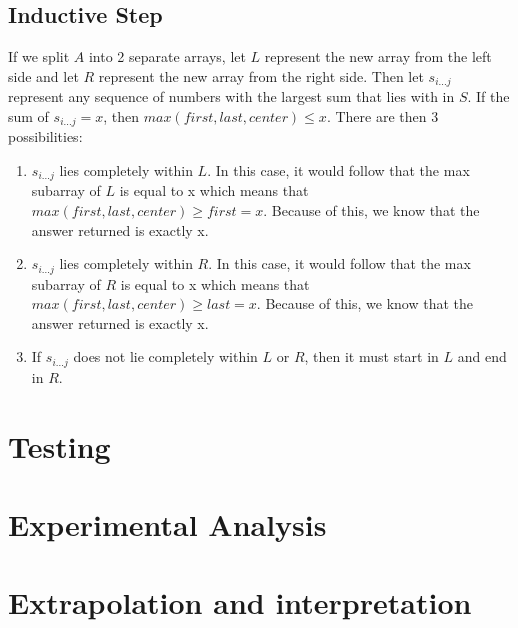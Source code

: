 \documentclass[11pt,letterpaper]{article}
\begin{document}
\subsection*{Inductive Step}
If we split $A$ into 2 separate arrays, let $L$ represent the new array from the left side and let $R$ represent the new array from the right side. Then let $s_{i...j}$ represent any sequence of numbers with the largest sum that lies with in $S$. If the sum of $s_{i...j} = x$, then $max(first, last, center) \leq x$. There are then 3 possibilities:
\begin{enumerate}
\item $s_{i...j}$ lies completely within $L$. In this case, it would follow that the max subarray of $L$ is equal to x which means that $max(first, last, center) \geq first = x$. Because of this, we know that the answer returned is exactly x.
\item $s_{i...j}$ lies completely within $R$. In this case, it would follow that the max subarray of $R$ is equal to x which means that $max(first, last, center) \geq last = x$. Because of this, we know that the answer returned is exactly x.
\item If $s_{i...j}$ does not lie completely within $L$ or $R$, then it must start in $L$ and end in $R$. 
\end{enumerate}

\section{Testing}


\section{Experimental Analysis}


\section{Extrapolation and interpretation}
\end{document}
